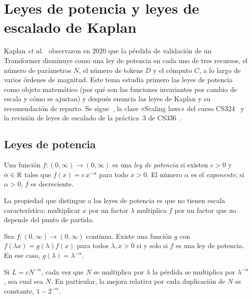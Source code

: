 \chapter{Leyes de potencia y leyes de escalado de Kaplan}
\label{tema:3}

Kaplan \emph{et al.}~\cite{kaplan} observaron en 2020 que la pérdida de validación de un Transformer disminuye como una ley de potencia en cada uno de tres recursos, el número de parámetros $N$, el número de tokens $D$ y el cómputo $C$, a lo largo de varios órdenes de magnitud. Este tema estudia primero las leyes de potencia como objeto matemático (por qué son las funciones invariantes por cambio de escala y cómo se ajustan) y después enuncia las leyes de Kaplan y su recomendación de reparto. Se sigue~\cite[§1.2, §4 y §6]{kaplan}, la clase «Scaling laws» del curso CS324~\cite{cs324} y la revisión de leyes de escalado de la práctica~3 de CS336~\cite[§2]{cs336a3}.

\section{Leyes de potencia}

\begin{definicion}
Una función $f\colon(0,\infty)\to(0,\infty)$ es una \emph{ley de potencia} si existen $c>0$ y $\alpha\in\mathbb{R}$ tales que $f(x)=c\,x^{-\alpha}$ para todo $x>0$. El número $\alpha$ es el \emph{exponente}; si $\alpha>0$, $f$ es decreciente.
\end{definicion}

La propiedad que distingue a las leyes de potencia es que no tienen escala característica: multiplicar $x$ por un factor $\lambda$ multiplica $f$ por un factor que no depende del punto de partida.

\begin{proposicion}\label{prop:escala}
Sea $f\colon(0,\infty)\to(0,\infty)$ continua. Existe una función $g$ con $f(\lambda x)=g(\lambda)f(x)$ para todos $\lambda,x>0$ si y solo si $f$ es una ley de potencia. En ese caso, $g(\lambda)=\lambda^{-\alpha}$.
\end{proposicion}

\begin{corolario}\label{cor:factor}
Si $L=cN^{-\alpha}$, cada vez que $N$ se multiplica por $\lambda$ la pérdida se multiplica por $\lambda^{-\alpha}$, sea cual sea $N$. En particular, la mejora relativa por cada duplicación de $N$ es constante, $1-2^{-\alpha}$.
\end{corolario}

